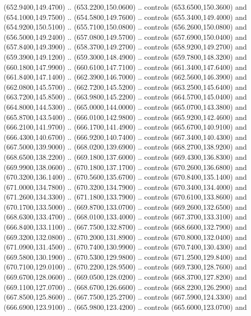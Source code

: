 {\begin{scope}[y=0.80pt, x=0.80pt, yscale=-1, xscale=1, inner sep=0pt, outer sep=0pt, #1]
      (652.9400,149.4700) .. (653.2200,150.0600) .. controls (653.6500,150.3600) and
      (654.1000,149.7500) .. (654.5800,149.7600) .. controls (655.3400,149.4000) and
      (654.9200,150.5100) .. (655.7100,150.0800) .. controls (656.2600,150.0800) and
      (656.5000,149.2400) .. (657.0800,149.5700) .. controls (657.6900,150.0400) and
      (657.8400,149.3900) .. (658.3700,149.2700) .. controls (658.9200,149.2700) and
      (659.3900,149.1200) .. (659.3000,148.4900) .. controls (659.7800,148.3200) and
      (660.1800,147.9900) .. (660.6100,147.7100) .. controls (661.3400,147.6400) and
      (661.8400,147.1400) .. (662.3900,146.7000) .. controls (662.5600,146.3900) and
      (662.0800,145.5700) .. (662.7200,145.5200) .. controls (663.2500,145.6400) and
      (663.7200,145.8500) .. (663.9800,145.2200) .. controls (664.5700,145.0400) and
      (664.8000,144.5300) .. (665.0000,144.0000) .. controls (665.0700,143.3800) and
      (665.8700,143.5400) .. (666.0100,142.9800) .. controls (665.9200,142.4600) and
      (666.2100,141.9700) .. (666.1700,141.4900) .. controls (665.6700,140.9100) and
      (666.4300,140.6700) .. (666.9200,140.7400) .. controls (667.3400,140.4300) and
      (667.5000,139.9000) .. (668.0200,139.6900) .. controls (668.2700,138.9200) and
      (668.6500,138.2200) .. (669.1800,137.6000) .. controls (669.4300,136.8300) and
      (669.9900,138.0600) .. (670.1800,137.1700) .. controls (670.2600,136.6800) and
      (670.3200,136.1400) .. (670.5600,135.6700) .. controls (670.8400,135.1400) and
      (671.0000,134.7800) .. (670.3200,134.7900) .. controls (670.3400,134.4000) and
      (671.2600,134.3300) .. (671.1800,133.7900) .. controls (670.6100,133.8600) and
      (670.1700,133.5000) .. (669.8700,133.0700) .. controls (669.2600,132.6500) and
      (668.6300,133.4700) .. (668.0100,133.4000) .. controls (667.3700,133.3100) and
      (666.8400,133.1100) .. (667.7500,132.8700) .. controls (668.6600,132.7900) and
      (669.3200,132.0800) .. (670.2000,131.8900) .. controls (670.8000,132.0400) and
      (671.0900,131.4500) .. (670.7400,130.9900) .. controls (670.7400,130.4300) and
      (669.5800,130.1900) .. (670.5300,129.9800) .. controls (671.2500,129.8400) and
      (670.7100,129.0100) .. (670.2200,128.9500) .. controls (669.7300,128.7600) and
      (669.6700,128.0600) .. (669.0500,128.0200) .. controls (668.3700,127.8200) and
      (669.1100,127.0700) .. (668.6700,126.6600) .. controls (668.2200,126.2900) and
      (667.8500,125.8600) .. (667.7500,125.2700) .. controls (667.5900,124.3300) and
      (666.6900,123.9100) .. (665.9800,123.4200) .. controls (665.6000,123.0700) and

\end{scope}}
